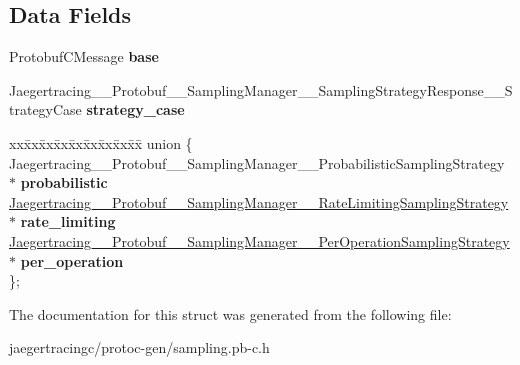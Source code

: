 \subsection*{Data Fields}
\begin{DoxyCompactItemize}
\item 
\mbox{\label{struct__Jaegertracing____Protobuf____SamplingManager____SamplingStrategyResponse_a888d5c3298752e9d8918475944738692}} 
Protobuf\+C\+Message {\bfseries base}
\item 
\mbox{\label{struct__Jaegertracing____Protobuf____SamplingManager____SamplingStrategyResponse_ad0e1de7ecc2ef6ccbe9936c701380150}} 
Jaegertracing\+\_\+\+\_\+\+Protobuf\+\_\+\+\_\+\+Sampling\+Manager\+\_\+\+\_\+\+Sampling\+Strategy\+Response\+\_\+\+\_\+\+Strategy\+Case {\bfseries strategy\+\_\+case}
\item 
\mbox{\label{struct__Jaegertracing____Protobuf____SamplingManager____SamplingStrategyResponse_af3398ad3890a72d6708ed91f1e61dd5b}} 
\begin{tabbing}
xx\=xx\=xx\=xx\=xx\=xx\=xx\=xx\=xx\=\kill
union \{\\
\>Jaegertracing\_\_Protobuf\_\_SamplingManager\_\_ProbabilisticSamplingStrategy $\ast$ {\bfseries probabilistic}\\
\>\mbox{\hyperlink{struct__Jaegertracing____Protobuf____SamplingManager____RateLimitingSamplingStrategy}{Jaegertracing\_\_Protobuf\_\_SamplingManager\_\_RateLimitingSamplingStrategy}} $\ast$ {\bfseries rate\_limiting}\\
\>\mbox{\hyperlink{struct__Jaegertracing____Protobuf____SamplingManager____PerOperationSamplingStrategy}{Jaegertracing\_\_Protobuf\_\_SamplingManager\_\_PerOperationSamplingStrategy}} $\ast$ {\bfseries per\_operation}\\
\}; \\

\end{tabbing}\end{DoxyCompactItemize}


The documentation for this struct was generated from the following file\+:\begin{DoxyCompactItemize}
\item 
jaegertracingc/protoc-\/gen/sampling.\+pb-\/c.\+h\end{DoxyCompactItemize}
